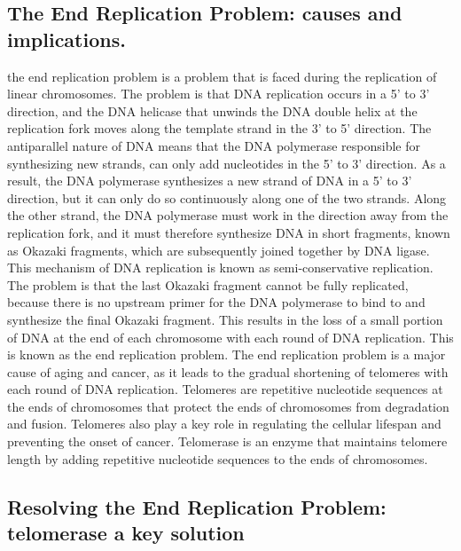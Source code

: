 \documentclass{report}
\begin{document}
\subsection*{The End Replication Problem: causes and implications.}

the end replication problem is a problem that is faced during the replication of linear chromosomes.
The problem is that DNA replication occurs in a 5' to 3' direction, and the DNA helicase that unwinds the DNA double helix at the replication fork moves along the template strand in the 3' to 5' direction.
The antiparallel nature of DNA means that the DNA polymerase responsible for synthesizing new strands, can only add nucleotides in the 5' to 3' direction.
As a result, the DNA polymerase synthesizes a new strand of DNA in a 5' to 3' direction, but it can only do so continuously along one of the two strands.
Along the other strand, the DNA polymerase must work in the direction away from the replication fork, and it must therefore synthesize DNA in short fragments, known as Okazaki fragments, which are subsequently joined together by DNA ligase.
This mechanism of DNA replication is known as semi-conservative replication.
The problem is that the last Okazaki fragment cannot be fully replicated, because there is no upstream primer for the DNA polymerase to bind to and synthesize the final Okazaki fragment.
This results in the loss of a small portion of DNA at the end of each chromosome with each round of DNA replication.
This is known as the end replication problem.
The end replication problem is a major cause of aging and cancer, as it leads to the gradual shortening of telomeres with each round of DNA replication.
Telomeres are repetitive nucleotide sequences at the ends of chromosomes that protect the ends of chromosomes from degradation and fusion.
Telomeres also play a key role in regulating the cellular lifespan and preventing the onset of cancer.
Telomerase is an enzyme that maintains telomere length by adding repetitive nucleotide sequences to the ends of chromosomes.


\subsection*{Resolving the End Replication Problem: telomerase a key solution}
\end{document}
